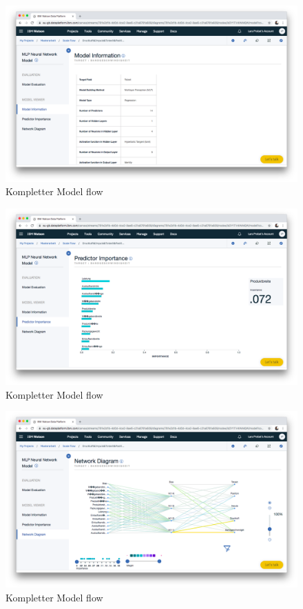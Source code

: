 \begin{figure}[h]
    \centering
    \includegraphics[scale=0.26]{images/kapitel_3/model_information.png}
    \caption{Kompletter Model flow}
    \label{fig:umsetzung_model_information}
\end{figure}

\begin{figure}[h]
    \centering
    \includegraphics[scale=0.26]{images/kapitel_3/model_predictor.png}
    \caption{Kompletter Model flow}
    \label{fig:umsetzung_model_predictor}
\end{figure}

\begin{figure}[h]
    \centering
    \includegraphics[scale=0.26]{images/kapitel_3/model_network_diagram.png}
    \caption{Kompletter Model flow}
    \label{fig:umsetzung_model_network_diagram}
\end{figure}

